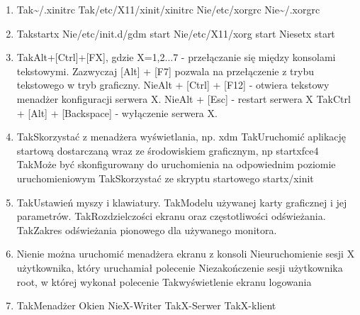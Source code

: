 \begin{enumerate}
	\item {}
	{Tak}{\textasciitilde/.xinitrc}
	{Tak}{/etc/X11/xinit/xinitrc}
	{Nie}{/etc/xorgrc}
	{Nie}{\textasciitilde/.xorgrc}
	
	\item {}
	{Tak}{startx}
	{Nie}{/etc/init.d/gdm start}
	{Nie}{/etc/X11/xorg start}
	{Nie}{setx start}
	
	\item {}
	{Tak}{Alt+[Ctrl]+[FX], gdzie X={1,2...7} - przełączanie się między konsolami tekstowymi. Zazwyczaj [Alt] + [F7] pozwala na przełączenie z trybu tekstowego  w tryb graficzny.}
	{Nie}{Alt + [Ctrl] + [F12] - otwiera tekstowy menadżer konfiguracji serwera X.}
	{Nie}{Alt + [Esc] - restart serwera X}
	{Tak}{Ctrl + [Alt] + [Backspace] - wyłączenie serwera X.}
	
	\item {}
	{Tak}{Skorzystać z menadżera wyświetlania, np. xdm}
	{Tak}{Uruchomić aplikację startową dostarczaną wraz ze środowiskiem graficznym, np startxfce4}
	{Tak}{Może być skonfigurowany do uruchomienia na odpowiednim poziomie uruchomieniowym}
	{Tak}{Skorzystać ze skryptu startowego startx/xinit}

	\item {}
	{Tak}{Ustawień myszy i klawiatury.}
	{Tak}{Modelu używanej karty graficznej i jej parametrów.}
	{Tak}{Rozdzielczości ekranu oraz częstotliwości odświeżania.}
	{Tak}{Zakres odświeżania pionowego dla używanego monitora.}
	
	\newpage
	
	\item {}
	{Nie}{nie można uruchomić menadżera ekranu z konsoli}
	{Nie}{uruchomienie sesji X użytkownika, który uruchamiał polecenie}
	{Nie}{zakończenie sesji użytkownika root, w której wykonał polecenie}
	{Tak}{wyświetlenie ekranu logowania}
	
	\item {}
	{Tak}{Menadżer Okien}
	{Nie}{X-Writer}
	{Tak}{X-Serwer}
	{Tak}{X-klient}
	

\end{enumerate}
